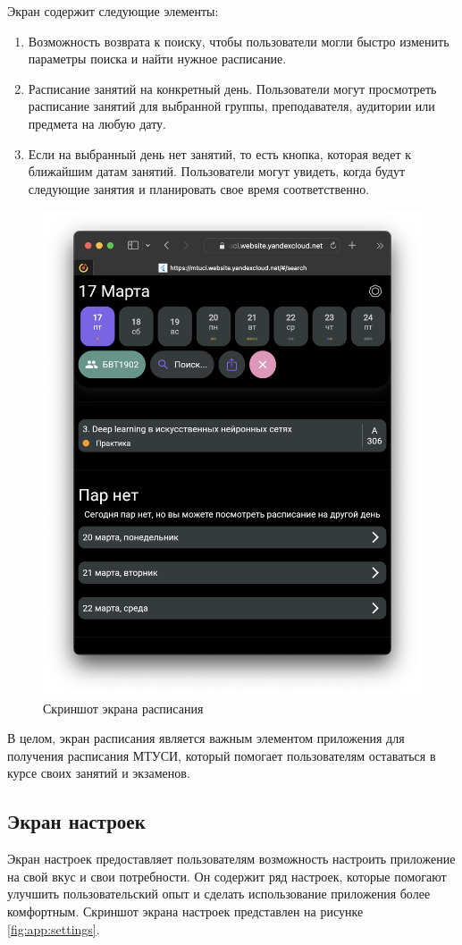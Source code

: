Экран содержит следующие элементы:
\begin{enumerate}
    \item Возможность возврата к поиску, 
    чтобы пользователи могли быстро изменить параметры поиска и найти нужное расписание.
    \item Расписание занятий на конкретный день.
    Пользователи могут просмотреть расписание занятий для выбранной группы,
    преподавателя, аудитории или предмета на любую дату.
    \item Если на выбранный день нет занятий,
    то есть кнопка, которая ведет к ближайшим датам занятий.
    Пользователи могут увидеть, когда будут следующие занятия и планировать свое время соответственно.
\end{enumerate}


\begin{figure}
\centering
\includegraphics[width=0.8\linewidth]{images/app/rasp.png}
\caption{Скриншот экрана расписания}
\label{fig:app:rasp}
\end{figure}

В целом, экран расписания является важным элементом приложения
для получения расписания МТУСИ, который помогает пользователям оставаться
в курсе своих занятий и экзаменов.

\break
\subsection{Экран настроек}
Экран настроек предоставляет пользователям возможность настроить
приложение на свой вкус и свои потребности.
Он содержит ряд настроек, которые помогают улучшить
пользовательский опыт и сделать использование приложения более комфортным.
Скриншот экрана настроек представлен на рисунке \ref{fig:app:settings}.

